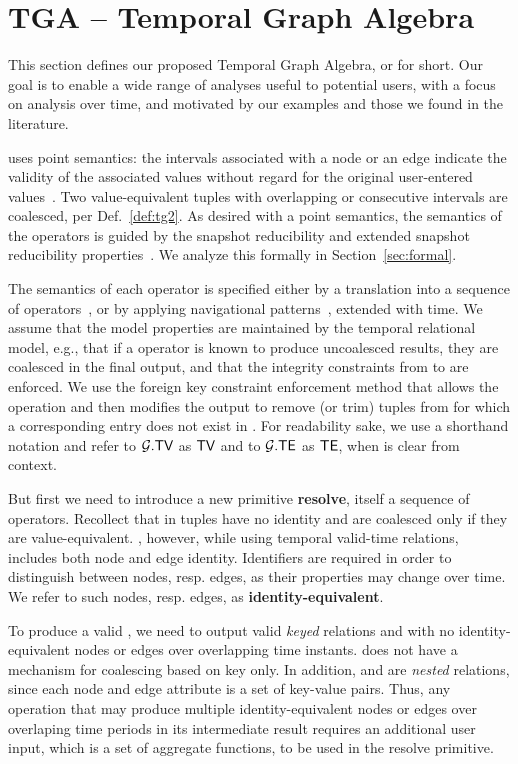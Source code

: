 \section{TGA -- Temporal Graph Algebra}
\label{sec:algebra}

This section defines our proposed Temporal Graph Algebra, or \tga for
short.  Our goal is to enable a wide range of analyses useful to
potential users, with a focus on analysis over time, and motivated by
our examples and those we found in the literature.

\tga uses point semantics: the intervals associated with a node or an
edge indicate the validity of the associated values without regard for
the original user-entered values~\cite{DBLP:reference/db/JensenS09k}.
Two value-equivalent tuples with overlapping or consecutive intervals
are coalesced, per Def.~\ref{def:tg2}.  As desired with a point
semantics, the semantics of the \tga operators is guided by the
snapshot reducibility and extended snapshot reducibility
properties~\cite{Dignos2012}.  We analyze this formally in
Section~\ref{sec:formal}.

The semantics of each operator is specified either by a translation
into a sequence of \tra operators~\cite{Dignos2012}, or by applying
navigational patterns~\cite{DBLP:journals/corr/AnglesABHRV16},
extended with time.  We assume that the model properties are
maintained by the temporal relational model, e.g., that if a \tra
operator is known to produce uncoalesced results, they are coalesced
in the final output, and that the integrity constraints from \te to
\tv are enforced.  We use the foreign key constraint enforcement
method that allows the operation and then modifies the output to
remove (or trim) tuples from \te for which a corresponding entry does
not exist in \tv.  For readability sake, we use a shorthand notation
and refer to $\mathcal{G}.\textsf{TV}$ as $\textsf{TV}$ and to $\mathcal{G}.\textsf{TE}$ as $\textsf{TE}$, when \tve
is clear from context.

But first we need to introduce a new primitive {\bf resolve}, itself a
sequence of \tra operators.  Recollect that in \tra tuples have no
identity and are coalesced only if they are value-equivalent.  \tga,
however, while using temporal valid-time relations, includes both node
and edge identity.  Identifiers are required in order to distinguish
between nodes, resp. edges, as their properties may change over time.
We refer to such nodes, resp. edges, as {\bf
  identity-equivalent}.

To produce a valid \tg, we need to output valid {\em keyed} relations
\tv and \te with no identity-equivalent nodes or edges over
overlapping time instants.  \tra does not have a mechanism for
coalescing based on key only.  In addition, \tv and \te are {\em
  nested} relations, since each node and edge attribute is a set of
key-value pairs.  Thus, any \tga operation that may produce multiple
identity-equivalent nodes or edges over overlaping time periods in its
intermediate result requires an additional user input, which is a set
of aggregate functions, to be used in the resolve primitive.

